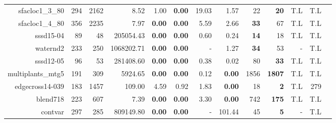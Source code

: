 \begin{landscape}
\begin{table*}[t]
\begin{tabular}{|r|r|r||r||r|r|r|r||r|r|r|r|r|}
                     sfacloc1\_3\_80 &           294 &          2162 &                              8.52 &           1.00 &  \textbf{0.00} &          19.03 &           1.57 &                 22 &        \textbf{20} &                T.L &                T.L \\ 
                     sfacloc1\_4\_80 &           356 &          2235 &                              7.97 &  \textbf{0.00} &  \textbf{0.00} &           5.59 &           2.66 &        \textbf{33} &                 67 &                T.L &                T.L \\ 
                           sssd15-04 &            89 &            48 &                         205054.43 &  \textbf{0.00} &  \textbf{0.00} &           0.60 &           0.24 &        \textbf{14} &                 18 &                T.L &                T.L \\ 
                            waternd2 &           233 &           250 &                        1068202.71 &  \textbf{0.00} &  \textbf{0.00} &              - &           1.27 &        \textbf{34} &                 53 &                  - &                T.L \\ 
                           sssd12-05 &            96 &            53 &                         281408.60 &  \textbf{0.00} &  \textbf{0.00} &           0.38 &           0.02 &                 80 &        \textbf{33} &                T.L &                T.L \\ 
                   multiplants\_mtg5 &           191 &           309 &                           5924.65 &  \textbf{0.00} &  \textbf{0.00} &           0.12 &  \textbf{0.00} &               1856 &      \textbf{1807} &                T.L &                T.L \\ 
                     edgecross14-039 &           183 &          1457 &                            109.00 &           4.59 &           0.92 &           1.83 &  \textbf{0.00} &                 18 &         \textbf{2} &                T.L &                279 \\ 
                            blend718 &           223 &           607 &                              7.39 &  \textbf{0.00} &  \textbf{0.00} &           3.30 &  \textbf{0.00} &                742 &       \textbf{175} &                T.L &                T.L \\ 
                             contvar &           297 &           285 &                         809149.80 &  \textbf{0.00} &  \textbf{0.00} &              - &         101.44 &                 45 &         \textbf{5} &                  - &                T.L \\ 

\end{tabular}
\end{table*}
\end{landscape}
